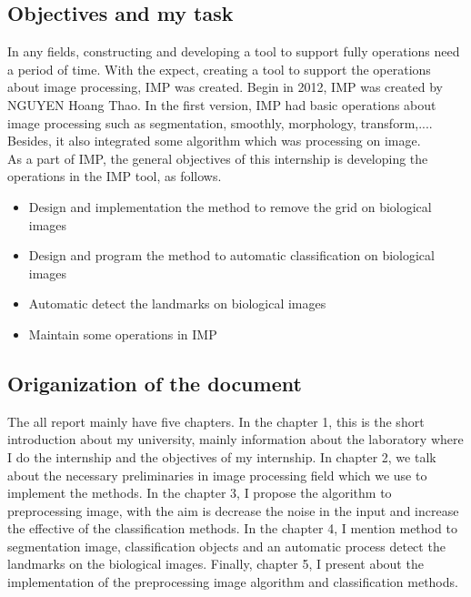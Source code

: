 \subsection{Objectives and my task}
In any fields, constructing and developing a tool to support fully operations need a period of time. With the expect, creating a tool to support the operations about image processing, IMP was created. Begin in 2012, IMP was created by NGUYEN Hoang Thao. In the first version, IMP had basic operations about image processing such as segmentation, smoothly, morphology, transform,.... Besides, it also integrated some algorithm which was processing on image.\\[0.2cm]
As a part of IMP, the general objectives of this internship is developing the operations in the IMP tool, as follows.
\begin{itemize}
\item Design and implementation the method to remove the grid on biological images
\item Design and program the method to automatic classification on biological images
\item Automatic detect the landmarks on biological images
\item Maintain some operations in IMP
\end{itemize}
\subsection{Origanization of the document}
The all report mainly have five chapters. In the chapter 1, this is the short introduction about my university, mainly information about the laboratory where I do the internship and the objectives of my internship. In chapter 2, we talk about the necessary preliminaries in image processing field which we use to implement the methods. In the chapter 3, I propose the algorithm to preprocessing image, with the aim is decrease the noise in the input and increase the effective of the classification methods. In the chapter 4, I mention method to segmentation image, classification objects and an automatic process detect the landmarks on the biological images. Finally, chapter 5, I present about the implementation of the preprocessing image algorithm and classification methods.






























